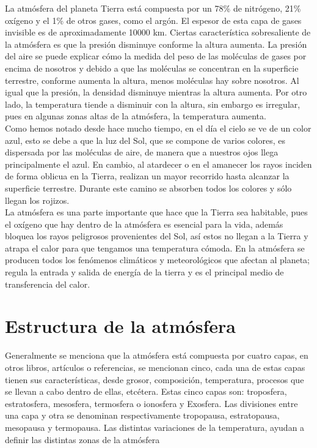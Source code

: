 \documentclass{article}
\begin{document}
\begin{doublespace}
La atmósfera del planeta Tierra está compuesta por un 78\% de nitrógeno,  21\% oxígeno y el 1\% de otros gases, como el argón. El espesor de esta capa de gases invisible es de aproximadamente 10000 km. Ciertas característica sobresaliente de la atmósfera es que la presión disminuye conforme la altura aumenta. La presión del aire se puede explicar cómo la medida del peso de las moléculas de gases por encima de nosotros y debido a que las moléculas se concentran en la superficie terrestre, conforme aumenta la altura, menos moléculas hay sobre nosotros. Al igual que la presión, la densidad disminuye mientras la altura aumenta. Por otro lado, la temperatura tiende a disminuir con la altura, sin embargo es irregular, pues en algunas zonas altas de la atmósfera, la temperatura aumenta.
\\

Como hemos notado desde hace mucho tiempo, en el día el cielo se ve de un color azul, esto se debe a que la luz del Sol, que se compone de varios colores, es dispersada por las  moléculas de aire, de manera que a nuestros ojos llega principalmente el azul. En cambio, al atardecer o en el amanecer los rayos inciden de forma oblicua en la Tierra, realizan un mayor recorrido hasta alcanzar la superficie terrestre. Durante este camino se absorben todos los colores y sólo llegan los rojizos.
\\

La atmósfera es una parte importante que hace que la Tierra sea habitable, pues el oxígeno que hay dentro de la atmósfera es esencial para la vida, además bloquea los rayos peligrosos provenientes del Sol, así estos no llegan a la Tierra y atrapa el calor para que tengamos una temperatura cómoda. En la atmósfera se producen todos los fenómenos climáticos y meteorológicos que afectan al planeta; regula la entrada y salida de energía de la tierra y es el principal medio de transferencia del calor.

\section{Estructura de la atmósfera}
Generalmente se menciona que la atmósfera está compuesta por cuatro capas, en otros libros, artículos o referencias, se mencionan cinco, cada una de estas capas tienen sus características, desde grosor, composición, temperatura, procesos que se llevan a cabo dentro de ellas, etcétera. Estas cinco capas son: troposfera, estratosfera, mesosfera, termosfera o ionosfera y Exosfera. Las divisiones entre una capa y otra se denominan respectivamente tropopausa, estratopausa, mesopausa y termopausa. Las distintas variaciones de la temperatura, ayudan a definir las distintas zonas de la atmósfera


\end{doublespace}
\end{document}

